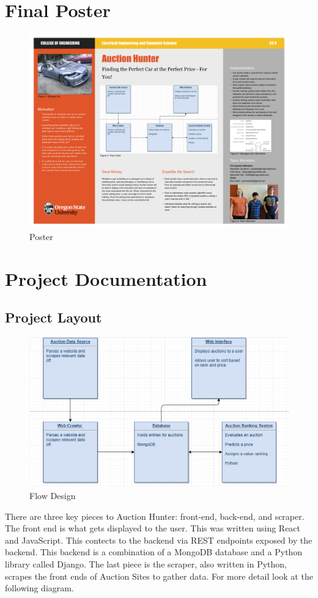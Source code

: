 \documentclass[onecolumn, draftclsnofoot, 10pt, compsoc]{IEEEtran}
\begin{document}
\section{Final Poster}
\begin{figure}[H]
    \includegraphics[width=\textwidth,keepaspectratio]{Poster.pdf}
    \caption{Poster}
    \label{fig:my_label}
\end{figure}


\section{Project Documentation}
\subsection{Project Layout}
\begin{figure}[ht]
    \includegraphics[scale=0.75]{flow_capture}
    \caption{Flow Design}
    \label{fig:flow}
\end{figure}
There are three key pieces to Auction Hunter: front-end, back-end, and scraper. The front end is what gets displayed to the user. This was written using React and JavaScript. This contects to the backend via REST endpoints exposed by the backend. This backend is a combination of a MongoDB database and a Python library called Django. The last piece is the scraper, also written in Python, scrapes the front ends of Auction Sites to gather data. For more detail look at the following diagram.
\end{document}
